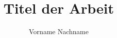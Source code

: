 \documentclass[uulm-release-electronic]{thesis-uulm} %
\author{Vorname Nachname}
\title{Titel der Arbeit}
\begin{document}
\frontmatter %
\begin{nolinenumbers}
\maketitle

\copyrightpage %
\end{nolinenumbers}


\begin{nolinenumbers}
\tableofcontents
\end{nolinenumbers}

\mainmatter %






\backmatter %

%
\end{document}
